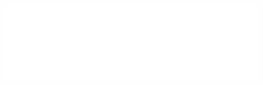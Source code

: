 \noindent\includegraphics[width=6.75in, height=4.25in]{testblock.pdf} 

\pagebreak \thispagestyle{empty} \label{instruction}

